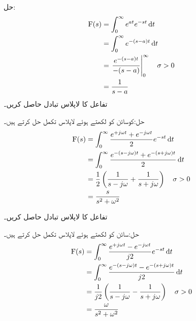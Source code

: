 حل:
\begin{align*}
\bF(s)&=\int_0^{\infty} e^{at} e^{-st} \dif t\\
&=\int_0^{\infty} e^{-(s-a)t} \dif t\\
&=\left. \frac{e^{-(s-a)t}}{-(s-a)}\right|_0^{\infty} \quad \sigma>0\\
&=\frac{1}{s-a}
\end{align*}
تفاعل  کا لاپلاس تبادل حاصل کریں۔

حل:کوسائن کو  لکھتے ہوئے لاپلاس تکمل حل کرتے ہیں۔
\begin{align*}
\bF(s)&=\int_0^{\infty} \frac{e^{+j\omega t}+e^{-j\omega t}}{2} e^{-st} \dif t\\
&=\int_0^{\infty} \frac{e^{-(s-j\omega)t}+e^{-(s+j\omega)t}}{2} \dif t\\
&=\frac{1}{2}\left(\frac{1}{s-j\omega}+\frac{1}{s+j\omega}\right) \quad \sigma>0\\
&=\frac{s}{s^2+\omega^2}
\end{align*}

تفاعل  کا لاپلاس تبادل حاصل کریں۔

حل:سائن کو  لکھتے ہوئے لاپلاس تکمل حل کرتے ہیں۔
\begin{align*}
\bF(s)&=\int_0^{\infty} \frac{e^{+j\omega t}-e^{-j\omega t}}{j2} e^{-st} \dif t\\
&=\int_0^{\infty} \frac{e^{-(s-j\omega)t}-e^{-(s+j\omega)t}}{j2} \dif t\\
&=\frac{1}{j2}\left(\frac{1}{s-j\omega}-\frac{1}{s+j\omega}\right) \quad \sigma>0\\
&=\frac{\omega}{s^2+\omega^2}
\end{align*}

